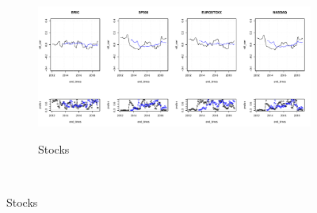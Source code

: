\begin{figure}
	\centering
	\begin{subfigure}{\textwidth}
		\centering
		\includegraphics[width=0.8\linewidth]{Images/rolling_stocks}
		\label{roll_stocks}
		\caption{Stocks}
	\end{subfigure}\\


\end{figure}
